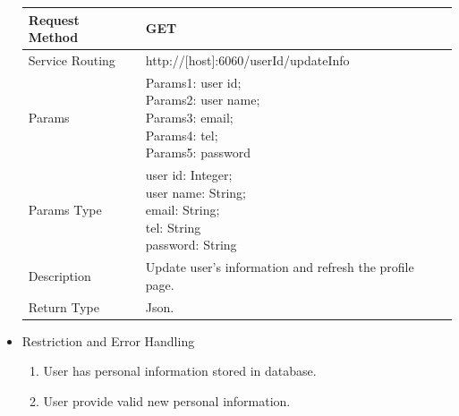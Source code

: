 \documentclass[16pt]{scrreprt}
\begin{document}
\begin{itemize}
\begin{center}
    \begin{tabular}{p{5cm}p{10cm}}
        \hline
	    Request Method & GET\\
        \hline
	    Service Routing &  http://[host]:6060/{userId}/updateInfo\\
        \hline
	    Params & \makecell[l]{Params1: user id;\\Params2: user name;\\Params3: email;\\Params4: tel;\\Params5: password}\\ 
        \hline
        Params Type & \makecell[l]{user id: Integer;\\user name: String;\\email: String;\\tel: String\\password: String}\\
        \hline
        Description & Update user's information and refresh the profile page.\\
        \hline
        Return Type & Json.\\
        \hline
    \end{tabular}
\end{center}
\item Restriction and Error Handling\\
\begin{enumerate}
	\item User has personal information stored in database.
	\item User provide valid new personal information.
\end{enumerate} 
\end{itemize}
\end{document}
